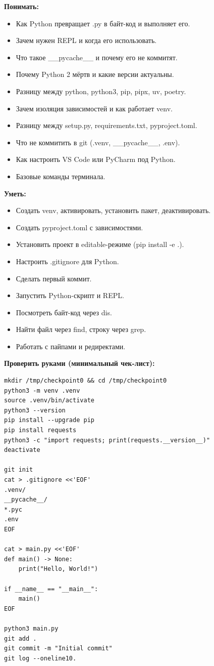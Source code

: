 \textbf{Понимать:}
\begin{itemize}
\item Как Python превращает .py в байт-код и выполняет его.
\item Зачем нужен REPL и когда его использовать.
\item Что такое \_\_pycache\_\_ и почему его не коммитят.
\item Почему Python 2 мёртв и какие версии актуальны.
\item Разницу между python, python3, pip, pipx, uv, poetry.
\item Зачем изоляция зависимостей и как работает venv.
\item Разницу между setup.py, requirements.txt, pyproject.toml.
\item Что не коммитить в git (.venv, \_\_pycache\_\_, .env).
\item Как настроить VS Code или PyCharm под Python.
\item Базовые команды терминала.
\end{itemize}

\textbf{Уметь:}
\begin{itemize}
\item Создать venv, активировать, установить пакет, деактивировать.
\item Создать pyproject.toml с зависимостями.
\item Установить проект в editable-режиме (pip install -e .).
\item Настроить .gitignore для Python.
\item Сделать первый коммит.
\item Запустить Python-скрипт и REPL.
\item Посмотреть байт-код через dis.
\item Найти файл через find, строку через grep.
\item Работать с пайпами и редиректами.
\end{itemize}

\textbf{Проверить руками (минимальный чек-лист):}
\begin{lstlisting}
mkdir /tmp/checkpoint0 && cd /tmp/checkpoint0
python3 -m venv .venv
source .venv/bin/activate
python3 --version
pip install --upgrade pip
pip install requests
python3 -c "import requests; print(requests.__version__)"
deactivate

git init
cat > .gitignore <<'EOF'
.venv/
__pycache__/
*.pyc
.env
EOF

cat > main.py <<'EOF'
def main() -> None:
    print("Hello, World!")

if __name__ == "__main__":
    main()
EOF

python3 main.py
git add .
git commit -m "Initial commit"
git log --oneline10. 
\end{lstlisting}

